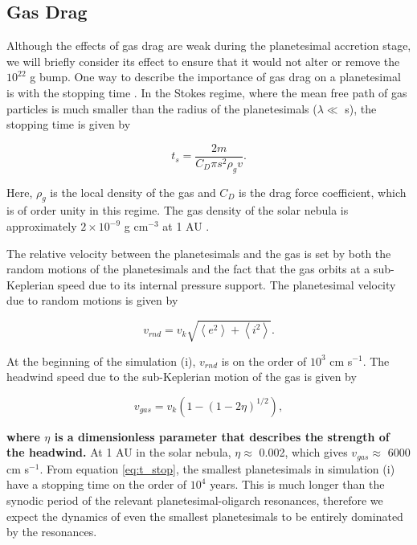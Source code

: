 \subsection{Gas Drag}

Although the effects of gas drag are weak during the planetesimal accretion stage, we will briefly consider its effect to ensure 
that it would not alter or remove the $10^{22}$ g bump. One way to describe the importance of gas drag on a planetesimal is 
with the stopping time \cite{adachi76}. In the Stokes regime, where the mean free path of gas particles is much smaller than the 
radius of the planetesimals ($\lambda \ll$ s), the stopping time is given by

\begin{equation}\label{eq:t_stop}
    t_{s} = \frac{2 m}{C_{D} \pi s^{2} \rho_{g} v}.
\end{equation}

\noindent Here, $\rho_{g}$ is the local density of the gas and $C_{D}$ is the drag force coefficient, which is of order unity in this 
regime. The gas density of the solar nebula is approximately $2 \times 10^{-9}$ g cm$^{-3}$ at 1 AU \cite{hayashi81}.

The relative velocity between the planetesimals and the gas is set by both the random motions of the planetesimals and the fact 
that the gas orbits at a sub-Keplerian speed due to its internal pressure support. The planetesimal velocity due to random 
motions is given by \cite{lissauer93}

\begin{equation}\label{eq:vrnd}
    v_{rnd} = v_{k} \sqrt{\left< e^2\right> + \left< i^2\right>}.
\end{equation}

\noindent At the beginning of the simulation (i), $v_{rnd}$ is on the order of $10^3$ cm s$^{-1}$. The headwind speed due to the 
sub-Keplerian motion of the gas is given by \cite{adachi76}

\begin{equation}\label{eq:vgas}
    v_{gas} = v_{k} \left( 1 - (1 - 2 \eta)^{1/2} \right),
\end{equation}

\noindent \textbf{where $\eta$ is a dimensionless parameter that describes the strength of the headwind.} At 1 AU in the solar nebula, $\eta \approx$ 0.002, which gives $v_{gas} \approx$ 6000 cm s$^{-1}$. From equation 
\ref{eq:t_stop}, the smallest planetesimals in simulation (i) have a stopping time on the order of $10^4$ years. This is much 
longer than the synodic period of the relevant planetesimal-oligarch resonances, therefore we expect the dynamics of even the 
smallest planetesimals to be entirely dominated by the resonances.

